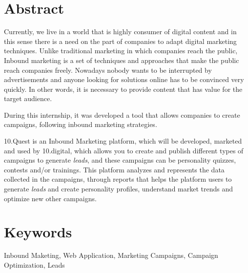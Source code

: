 \section*{Abstract}
\label{sec:abstract}


Currently, we live in a world that is highly consumer of digital content and in this sense there is a need on the part of companies to adapt digital marketing techniques. Unlike traditional marketing in which companies reach the public, Inbound marketing is a set of techniques and approaches that make the public reach companies freely. Nowadays nobody wants to be interrupted by advertisements and anyone looking for solutions online has to be convinced very quickly. In other words, it is necessary to provide content that has value for the target audience.

During this internship, it was developed a tool that allows companies to create campaigns, following inbound marketing strategies.

10.Quest is an Inbound Marketing platform, which will be developed, marketed and used by 10.digital, which allows you to create and publish different types of campaigns to generate  \textit {leads}, and these campaigns can be personality quizzes, contests and/or trainings. This platform analyzes and represents the data collected in the campaigns, through reports that helps the platform users to generate \textit {leads} and create personality profiles, understand market trends and optimize new other campaigns.



\section*{Keywords}
\label{sec:keywords}

Inbound Maketing, Web Application, Marketing Campaigns, Campaign Optimization, Leads 
